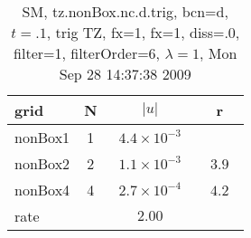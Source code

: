 \begin{table}[hbt]\tableFont %
\begin{center}
\begin{tabular}{|l|c|c|c|} \hline 
grid  & N &  $\vert u \vert$   & r \\ \hline 
             nonBox1 &     1 & ~$4.4\times10^{ -3}$~ &            \\ \hline
             nonBox2 &     2 & ~$1.1\times10^{ -3}$~ & ~$  3.9$~  \\ \hline
             nonBox4 &     4 & ~$2.7\times10^{ -4}$~ & ~$  4.2$~  \\ \hline
    rate             &       &       $2.00$         &        \\ \hline
\end{tabular}
\caption{SM, tz.nonBox.nc.d.trig, bcn=d, $t=.1$, trig TZ, fx=1, fx=1, diss=.0, filter=1, filterOrder=6, $\lambda=1$, Mon Sep 28 14:37:38 2009}\label{table:tz.nonBox.nc.d.trig}
\end{center}
\end{table}
